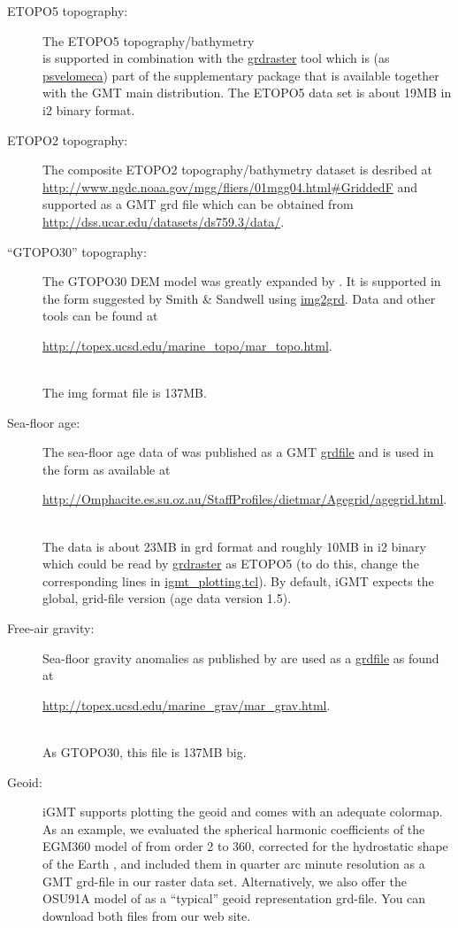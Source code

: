 \documentclass[11pt]{article}
\begin{document}
\begin{description}
  
\item[ETOPO5 topography:] The ETOPO5 topography/bathymetry\\
  \cite[][available at \url{http://www.ngdc.noaa.gov/}]{etopo5} is
  supported in combination with the \url{grdraster} tool which is (as
  \url{psvelomeca}) part of the supplementary package that is
  available together with the GMT main distribution. The ETOPO5 data
  set is about 19MB in i2 binary format.
  
\item[ETOPO2 topography:] The composite ETOPO2 topography/bathymetry
dataset is desribed at 
\url{http://www.ngdc.noaa.gov/mgg/fliers/01mgg04.html\#GriddedF}
and supported as a GMT grd file which can be obtained from\\ 
\url{http://dss.ucar.edu/datasets/ds759.3/data/}.
  
\item[``GTOPO30'' topography:] The GTOPO30 DEM model \citep{gtopo30}
  was greatly expanded by \cite{smith97}. It is supported in the form
  suggested by Smith \& Sandwell using \url{img2grd}.  
  Data and other tools can be found at\\
\centerline{\url{http://topex.ucsd.edu/marine_topo/mar_topo.html}.}\\
The img format file is 137MB.
  
\item[Sea-floor age:] The sea-floor age data of \cite{mueller97} was
  published as a GMT \url{grdfile} and is used in the form as
  available at\\
  \centerline{\url{http://Omphacite.es.su.oz.au/StaffProfiles/dietmar/Agegrid/agegrid.html}.}\\
  The data is about 23MB in grd format and roughly 10MB in i2 binary
  which could be read by \url{grdraster} as ETOPO5 (to do this, change
  the corresponding lines in \url{igmt_plotting.tcl}). By default,
  iGMT expects the global, grid-file version (age data version 1.5).
  
\item[Free-air gravity:] Sea-floor gravity anomalies as published by
  \cite{sandwell97} are used as a \url{grdfile} as found at\\
  \centerline{\url{http://topex.ucsd.edu/marine_grav/mar_grav.html}.}\\
  As GTOPO30, this file is 137MB big.
  
\item[Geoid:] iGMT supports plotting the geoid and comes with an
  adequate colormap.  As an example, we evaluated the spherical
  harmonic coefficients of the EGM360 model of \cite{rapp91,rapp96}
  from order 2 to 360, corrected for the hydrostatic shape of the
  Earth \citep{nakiboglu82}, and included them in quarter arc minute
  resolution as a GMT grd-file in our raster data set. Alternatively,
  we also offer the OSU91A model of \cite{rapp91} as a ``typical''
  geoid representation grd-file. You can download both files from our
  web site.
  

\end{description}
\end{document}
